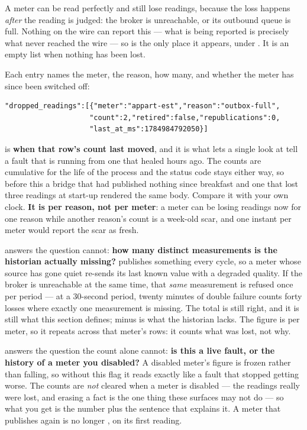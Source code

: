A meter can be read perfectly and still lose readings, because the loss happens \emph{after}
the reading is judged: the broker is unreachable, or its outbound queue is full. Nothing on
the wire can report this --- what is being reported is precisely what never reached the wire
--- so  is the only place it appears, under . It is an
empty list when nothing has been lost.

Each entry names the meter, the reason, how many, and whether the meter has since been
switched off:

\begin{verbatim}
"dropped_readings":[{"meter":"appart-est","reason":"outbox-full",
                    "count":2,"retired":false,"republications":0,
                    "last_at_ms":1784984792050}]
\end{verbatim}

 is \textbf{when that row's count last moved}, and it is what lets a single
look at  tell a fault that is running from one that healed hours ago. The counts
are cumulative for the life of the process and the status code stays  either way, so
before this a bridge that had published nothing since breakfast and one that lost three readings
at start-up rendered the same body. Compare it with your own clock. \textbf{It is per reason, not
per meter}: a meter can be losing readings now for one reason while another reason's count is a
week-old scar, and one instant per meter would report the scar as fresh.

 answers the question  cannot: \textbf{how many
distinct measurements is the historian actually missing?} \prog publishes something every
cycle, so a meter whose source has gone quiet re-sends its last known value with a degraded
quality. If the broker is unreachable at the same time, that \emph{same} measurement is refused
once per period --- at a 30-second period, twenty minutes of double failure counts forty losses
where exactly one measurement is missing. The total is still right, and it is still what this
section defines;  minus  is what the historian lacks. The
figure is per meter, so it repeats across that meter's rows: it counts what was lost, not why.

 answers the question the count alone cannot: \textbf{is this a live fault, or
the history of a meter you disabled?} A disabled meter's figure is frozen rather than falling,
so without this flag it reads exactly like a fault that stopped getting worse. The counts are
\emph{not} cleared when a meter is disabled --- the readings really were lost, and erasing a
fact is the one thing these surfaces may not do --- so what you get is the number plus the
sentence that explains it. A meter that publishes again is no longer , on its
first reading.

